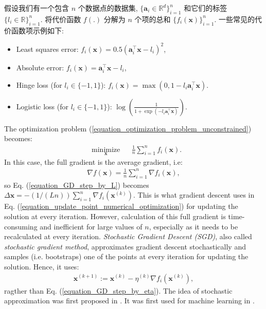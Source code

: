 \documentclass[lang=cn,10pt]{gorgeousnbook}
\numberwithin{equation}{section}%
\numberwithin{figure}{section}%
\begin{document}
假设我们有一个包含 $n$ 个数据点的数据集, $\{\boldsymbol{a}_i \in \mathbb{R}^d\}_{i=1}^n$ 和它们的标签 $\{l_i \in \mathbb{R}\}_{i=1}^n$. 
将代价函数 $f(.)$ 分解为 $n$ 个项的总和 $\{f_i(\boldsymbol{x})\}_{i=1}^n$. 一些常见的代价函数项示例如下: 
\begin{itemize}
\item Least squares error: $f_i(\boldsymbol{x}) = 0.5 (\boldsymbol{a}_i^\top \boldsymbol{x} - l_i)^2$,
\item Absolute error: $f_i(\boldsymbol{x}) = \boldsymbol{a}_i^\top \boldsymbol{x} - l_i$,
\item Hinge loss (for $l_i \in \{-1,1\}$): $f_i(\boldsymbol{x}) = \max(0, 1 - l_i \boldsymbol{a}_i^\top \boldsymbol{x})$.
\item Logistic loss (for $l_i \in \{-1,1\}$): $\log(\frac{1}{1 + \exp(-l_i \boldsymbol{a}_i^\top \boldsymbol{x})})$.
\end{itemize}
The optimization problem (\ref{equation_optimization_problem_unconstrained}) becomes:
\begin{equation}\label{equation_optimization_problem_unconstrained_SGD}
\begin{aligned}
& \underset{\boldsymbol{x}}{\text{minimize}}
& & \frac{1}{n} \sum_{i=1}^n f_i(\boldsymbol{x}).
\end{aligned}
\end{equation}
In this case, the full gradient is the average gradient, i.e:
\begin{align}\label{equation_gradient_average_of_gradients}
\nabla f(\boldsymbol{x}) = \frac{1}{n} \sum_{i=1}^n \nabla f_i(\boldsymbol{x}),
\end{align}
so Eq. (\ref{equation_GD_step_by_L}) becomes $\Delta \boldsymbol{x} = -(1/(Ln)) \sum_{i=1}^n \nabla f_i(\boldsymbol{x}^{(k)})$.
This is what gradient descent uses in Eq. (\ref{equation_update_point_numerical_optimization}) for updating the solution at every iteration. However, calculation of this full gradient is time-consuming and inefficient for large values of $n$, especially as it needs to be recalculated at every iteration. 
\textit{Stochastic Gradient Descent (SGD)}, also called \textit{stochastic gradient method}, approximates gradient descent stochastically and samples (i.e. bootstraps) one of the points at every iteration for updating the solution. Hence, it uses:
\begin{align}\label{equation_SGD_step_by_eta}
\boldsymbol{x}^{(k+1)} := \boldsymbol{x}^{(k)} - \eta^{(k)} \nabla f_i(\boldsymbol{x}^{(k)}),
\end{align}
ragther than Eq. (\ref{equation_GD_step_by_eta}). 
The idea of stochastic approximation was first proposed in \cite{robbins1951stochastic}. It was first used for machine learning in \cite{bottou1998online}. 
\end{document}
